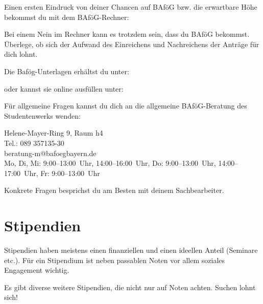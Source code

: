 Einen ersten Eindruck von deiner Chancen auf BAföG bzw. die erwartbare
Höhe bekommst du mit dem BAföG-Rechner:
\begin{urlList}
\end{urlList}

Bei einem Nein im Rechner kann es trotzdem sein, dass du BAföG
bekommst. Überlege, ob sich der Aufwand des Einreichens und
Nachreichens der Anträge für dich lohnt.

Die Bafög-Unterlagen erhältst du unter:
\begin{urlList}
\end{urlList}
oder kannst sie online ausfüllen unter: 
\begin{urlList}
\end{urlList}

Für allgemeine Fragen kannst du dich an die allgemeine BAföG-Beratung des Studentenwerks wenden:

Helene-Mayer-Ring 9, Raum h4\\
Tel.: 089 357135-30\\
beratung-m@bafoegbayern.de\\
Mo, Di, Mi: 9:00--13:00~Uhr, 14:00--16:00~Uhr, Do: 9:00--13:00~Uhr, 14:00--17:00~Uhr, Fr: 9:00--13:00~Uhr

Konkrete Fragen besprichst du am Besten mit deinem Sachbearbeiter.

\section{Stipendien}
Stipendien haben meistens einen finanziellen und einen ideellen Anteil
(Seminare etc.). Für ein Stipendium ist neben passablen Noten vor
allem soziales Engagement wichtig.

\begin{urlList}
\end{urlList}

Es gibt diverse weitere Stipendien, die nicht nur auf Noten achten.
Suchen lohnt sich!
